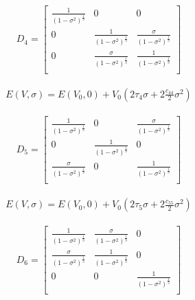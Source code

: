 \documentclass[12pt,twoside]{manual}
\begin{document}
  \begin{equation}
    \begin{split}
      D_{4} = 
      \begin{bmatrix}
      \frac{1}{(1-\sigma^2)^{\frac{1}{3}}} & 0           & 0             \\
      0                                    & \frac{1}{(1-\sigma^2)^{\frac{1}{3}}}      & \frac{\sigma}{(1-\sigma^2)^{\frac{1}{3}}}  \\
      0                                    & \frac{\sigma}{(1-\sigma^2)^{\frac{1}{3}}} & \frac{1}{(1-\sigma^2)^{\frac{1}{3}}}       \\
      \end{bmatrix}
    \end{split}
  \end{equation}

  \begin{equation}
    \begin{split}
    E(V,\sigma) = E(V_{0},0) + V_{0} \left(2 \tau_{4} \sigma + 2 \frac{c_{44}}{2} \sigma^2 \right)
    \end{split}
  \end{equation}

  \begin{equation}
    \begin{split}
      D_{5} = 
      \begin{bmatrix}
      \frac{1}{(1-\sigma^2)^{\frac{1}{3}}} & 0           & \frac{\sigma}{(1-\sigma^2)^{\frac{1}{3}}}              \\
      0                                    & \frac{1}{(1-\sigma^2)^{\frac{1}{3}}}      &   0  \\
      \frac{\sigma}{(1-\sigma^2)^{\frac{1}{3}}}   &   0  & \frac{1}{(1-\sigma^2)^{\frac{1}{3}}}       \\
      \end{bmatrix}
    \end{split}
  \end{equation}

  \begin{equation}
    \begin{split}
    E(V,\sigma) = E(V_{0},0) + V_{0} \left(2 \tau_{5} \sigma + 2 \frac{c_{55}}{2} \sigma^2 \right)
    \end{split}
  \end{equation}



  \begin{equation}
    \begin{split}
      D_{6} = 
      \begin{bmatrix}
      \frac{1}{(1-\sigma^2)^{\frac{1}{3}}}        & \frac{\sigma}{(1-\sigma^2)^{\frac{1}{3}}} & 0   \\
      \frac{\sigma}{(1-\sigma^2)^{\frac{1}{3}}}   & \frac{1}{(1-\sigma^2)^{\frac{1}{3}}}      &   0  \\
      0                                           & 0                                         & \frac{1}{(1-\sigma^2)^{\frac{1}{3}}}       \\
      \end{bmatrix}
    \end{split}
  \end{equation}
\end{document}
